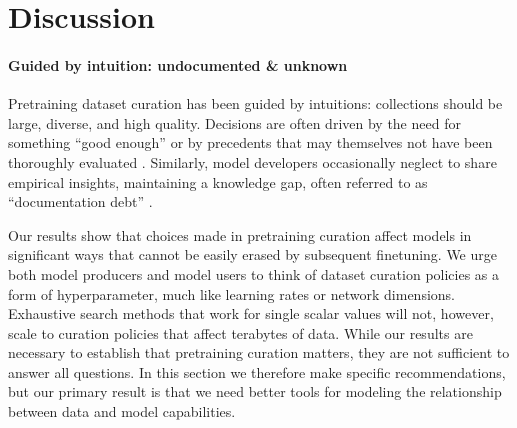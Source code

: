 \documentclass{article}
\begin{document}


\vspace{-3mm}
\section{Discussion}
\label{sec:discussion}

\vspace{-3mm}
\paragraph{Guided by intuition: undocumented \& unknown}
Pretraining dataset curation has been guided by intuitions: collections should be large, diverse, and high quality.
Decisions are often driven by the need for something ``good enough'' or by precedents that may themselves not have been thoroughly evaluated \citep{sambasivan2021everyone}.
Similarly, model developers occasionally neglect to share empirical insights, maintaining a knowledge gap, often referred to as ``documentation debt'' \citep{bandy2021addressing}.

Our results show that choices made in pretraining curation affect models in significant ways that cannot be easily erased by subsequent finetuning.
We urge both model producers and model users to think of dataset curation policies as a form of hyperparameter, much like learning rates or network dimensions.
Exhaustive search methods that work for single scalar values will not, however, scale to curation policies that affect terabytes of data.
While our results are necessary to establish that pretraining curation matters, they are not sufficient to answer all questions.
In this section we therefore make specific recommendations, but our primary result is that we need better tools for modeling the relationship between data and model capabilities.

\vspace{-3mm}
\end{document}
